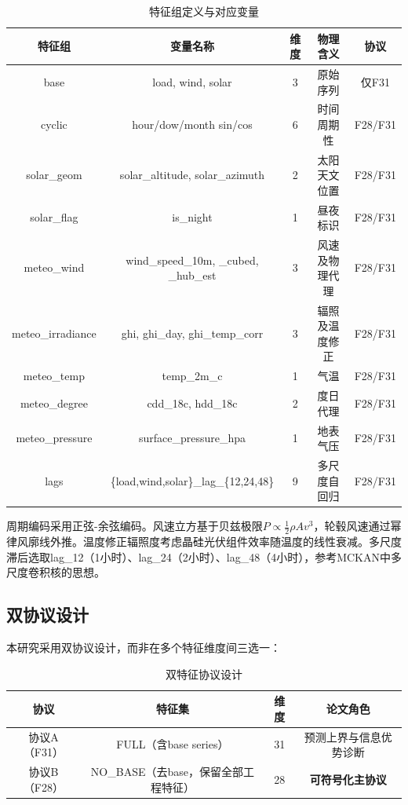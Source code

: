 \documentclass[12pt,a4paper,oneside]{ctexbook}
\begin{document}
\begin{table}[htbp]
\centering
\caption{特征组定义与对应变量}
\label{tab:feature-groups}
\begin{tabular}{ccccc}
\toprule
特征组 & 变量名称 & 维度 & 物理含义 & 协议 \\
\midrule
base & load, wind, solar & 3 & 原始序列 & 仅F31 \\
cyclic & hour/dow/month sin/cos & 6 & 时间周期性 & F28/F31 \\
solar\_geom & solar\_altitude, solar\_azimuth & 2 & 太阳天文位置 & F28/F31 \\
solar\_flag & is\_night & 1 & 昼夜标识 & F28/F31 \\
meteo\_wind & wind\_speed\_10m, \_cubed, \_hub\_est & 3 & 风速及物理代理 & F28/F31 \\
meteo\_irradiance & ghi, ghi\_day, ghi\_temp\_corr & 3 & 辐照及温度修正 & F28/F31 \\
meteo\_temp & temp\_2m\_c & 1 & 气温 & F28/F31 \\
meteo\_degree & cdd\_18c, hdd\_18c & 2 & 度日代理 & F28/F31 \\
meteo\_pressure & surface\_pressure\_hpa & 1 & 地表气压 & F28/F31 \\
lags & \{load,wind,solar\}\_lag\_\{12,24,48\} & 9 & 多尺度自回归 & F28/F31 \\
\bottomrule
\end{tabular}
\end{table}

周期编码采用正弦-余弦编码\cite{vaswani2017attention}。风速立方基于贝兹极限$P \propto \frac{1}{2}\rho A v^3$\cite{betz1920maximum}，轮毂风速通过幂律风廓线外推\cite{hellman1916wind}。温度修正辐照度考虑晶硅光伏组件效率随温度的线性衰减。多尺度滞后选取lag\_12（1小时）、lag\_24（2小时）、lag\_48（4小时），参考MCKAN\cite{chen2025mckan}中多尺度卷积核的思想。

\subsection{双协议设计}

本研究采用双协议设计，而非在多个特征维度间三选一：

\begin{table}[htbp]
\centering
\caption{双特征协议设计}
\label{tab:dual-protocol}
\begin{tabular}{cccc}
\toprule
协议 & 特征集 & 维度 & 论文角色 \\
\midrule
协议A（F31） & FULL（含base series） & 31 & 预测上界与信息优势诊断 \\
协议B（F28） & NO\_BASE（去base，保留全部工程特征） & 28 & \textbf{可符号化主协议} \\
\bottomrule
\end{tabular}
\end{table}
\end{document}
